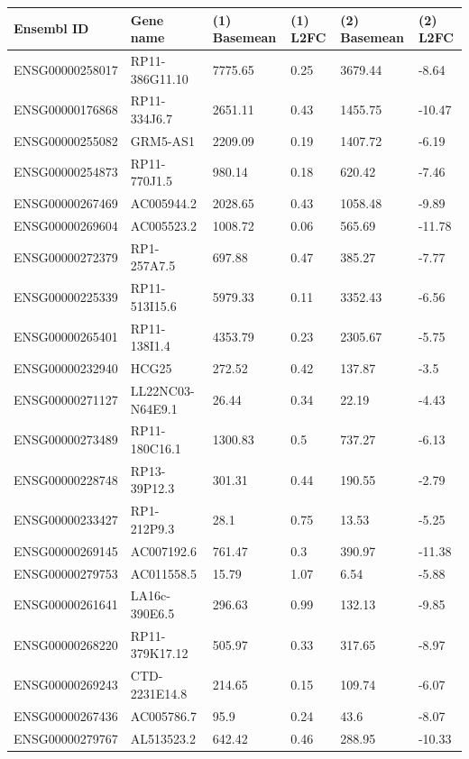 \documentclass[fleqn,10pt,table]{wlscirep}
\begin{document}
\begin{table}[ht]
\centering
{}
\begin{tabular}{|l|l|l|l|l|l|} \hline
Ensembl ID & Gene name & (1) Basemean & (1) L2FC & (2) Basemean & (2) L2FC \\ \hline
ENSG00000258017 & RP11-386G11.10 & 7775.65 & 0.25 & 3679.44 & -8.64 \\ \hline
ENSG00000176868 & RP11-334J6.7 & 2651.11 & 0.43 & 1455.75 & -10.47 \\ \hline
ENSG00000255082 & GRM5-AS1 & 2209.09 & 0.19 & 1407.72 & -6.19 \\ \hline
ENSG00000254873 & RP11-770J1.5 & 980.14 & 0.18 & 620.42 & -7.46 \\ \hline
ENSG00000267469 & AC005944.2 & 2028.65 & 0.43 & 1058.48 & -9.89 \\ \hline
ENSG00000269604 & AC005523.2 & 1008.72 & 0.06 & 565.69 & -11.78 \\ \hline
ENSG00000272379 & RP1-257A7.5 & 697.88 & 0.47 & 385.27 & -7.77 \\ \hline
ENSG00000225339 & RP11-513I15.6 & 5979.33 & 0.11 & 3352.43 & -6.56 \\ \hline
ENSG00000265401 & RP11-138I1.4 & 4353.79 & 0.23 & 2305.67 & -5.75 \\ \hline
ENSG00000232940 & HCG25 & 272.52 & 0.42 & 137.87 & -3.5 \\ \hline
ENSG00000271127 & LL22NC03-N64E9.1 & 26.44 & 0.34 & 22.19 & -4.43 \\ \hline
ENSG00000273489 & RP11-180C16.1 & 1300.83 & 0.5 & 737.27 & -6.13 \\ \hline
ENSG00000228748 & RP13-39P12.3 & 301.31 & 0.44 & 190.55 & -2.79 \\ \hline
ENSG00000233427 & RP1-212P9.3 & 28.1 & 0.75 & 13.53 & -5.25 \\ \hline
ENSG00000269145 & AC007192.6 & 761.47 & 0.3 & 390.97 & -11.38 \\ \hline
ENSG00000279753 & AC011558.5 & 15.79 & 1.07 & 6.54 & -5.88 \\ \hline
ENSG00000261641 & LA16c-390E6.5 & 296.63 & 0.99 & 132.13 & -9.85 \\ \hline
ENSG00000268220 & RP11-379K17.12 & 505.97 & 0.33 & 317.65 & -8.97 \\ \hline
ENSG00000269243 & CTD-2231E14.8 & 214.65 & 0.15 & 109.74 & -6.07 \\ \hline
ENSG00000267436 & AC005786.7 & 95.9 & 0.24 & 43.6 & -8.07 \\ \hline
ENSG00000279767 & AL513523.2 & 642.42 & 0.46 & 288.95 & -10.33 \\ \hline

\end{tabular}
\end{table}
\end{document}
